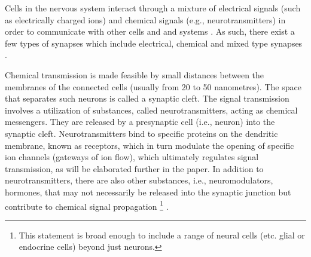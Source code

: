 \documentclass[class={myRUCProject}, crop=false]{standalone}
\begin{document}
Cells in the nervous system interact through a mixture of electrical signals (such as electrically charged ions) and chemical signals (e.g., neurotransmitters) \cite{lovinger2008communication} in order to communicate with other cells and and systems \cite{SHOYKHET2011783}. As such, there exist a few types of synapses which include electrical, chemical and mixed type synapses \cite{Hammond2015ch6, SZCZUPAK201699}. 


Chemical transmission is made feasible by small distances between the membranes of the connected cells (usually from 20 to 50 nanometres). The space that separates such neurons is called a synaptic cleft. The signal transmission involves a utilization of substances, called neurotransmitters, acting as chemical messengers. They are released by a presynaptic cell (i.e., neuron) into the synaptic cleft. Neurotransmitters bind to specific proteins on the dendritic membrane, known as receptors, which in turn modulate the opening of specific ion channels (gateways of ion flow), which ultimately regulates signal transmission, as will be elaborated further in the paper. In addition to neurotransmitters, there are also other substances, i.e., neuromodulators, hormones, that may not necessarily be released into the synaptic junction but contribute to chemical signal propagation \footnote{This statement is broad enough to include a range of neural cells (etc. glial or endocrine cells) beyond just neurons.} \cite{Hyman2005}.
\end{document}
